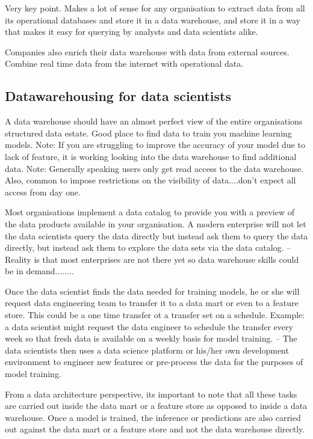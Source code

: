 \documentclass[a4paper, 11pt]{article}
\begin{document}
    Very key point.
    Makes a lot of sense for any organisation to extract data from all its operational databases and store it in a data warehouse,
    and store it in a way that makes it easy for querying by analysts and data scientists alike.

    Companies also enrich their data warehouse with data from external sources.
    Combine real time data from the internet with operational data.

    \subsection{Datawarehousing for data scientists}

    A data warehouse should have an almost perfect view of the entire organisations structured data estate.
    Good place to find data to train you machine learning models.
    Note: If you are struggling to improve the accuracy of your model due to lack of feature, it is working looking into the data warehouse to find additional data.
    Note: Generally speaking users only get read access to the data warehouse.
    Also, common to impose restrictions on the visibility of data....don't expect all access from day one.

    Most organisations implement a data catalog to provide you with a preview of the data products available in your organisation.
    A modern enterprise will not let the data scientists query the data directly but instead ask them to query the data directly, but instead ask them to explore the data sets via the data catalog.
    -- Reality is that most enterprises are not there yet so data warehouse skills could be in demand........

    Once the data scientist finds the data needed for training models, he or she will request data engineering team to transfer it to a data mart or even to a feature store.
    This could be a one time transfer ot a transfer set on a schedule.
    Example: a data scientist might request the data engineer to schedule the transfer every week so that fresh data is available on a weekly basis for model training.
    -- The data scientists then uses a data science platform or his/her own development environment to engineer new features or pre-process the data for the purposes of model training.

    From a data architecture perspective, its important to note that all these tasks are carried out inside the data mart or a feature store as opposed to inside a data warehouse.
    Once a model is trained, the inference or predictions are also carried out against the data mart or a feature store and not the data warehouse directly.
\end{document}
